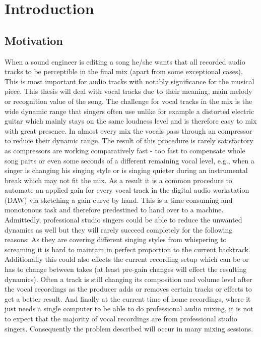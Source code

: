 \chapter{Introduction}
\label{chapter:introduction}

\section{Motivation}

When a sound engineer is editing a song he/she wants that all recorded audio tracks to be perceptible in the final mix (apart from some exceptional cases). This is most important for audio tracks with notably significance for the musical piece. This thesis will deal with vocal tracks due to their meaning, main melody or recognition value of the song. The challenge for vocal tracks in the mix is the wide dynamic range that singers often use unlike for example a distorted electric guitar which mainly stays on the same loudness level and is therefore easy to mix with great presence. In almost every mix the vocals pass through an compressor to reduce their dynamic range. The result of this procedure is rarely satisfactory as compressors are working comparatively fast - too fast to compensate whole song parts or even some seconds of a different remaining vocal level, e.g., when a singer is changing his singing style or is singing quieter during an instrumental break which may not fit the mix. As a result it is a common procedure to automate an applied gain for every vocal track in the digital audio workstation (DAW) via sketching a gain curve by hand. This is a time consuming and monotonous task and therefore predestined to hand over to a machine.\\
Admittedly, professional studio singers could be able to reduce the unwanted dynamics as well but they will rarely succeed completely for the following reasons: As they are covering different singing styles from whispering to screaming it is hard to maintain in perfect proportion to the current backtrack. Additionally this could also effects the current recording setup which can be or has to change between takes (at least pre-gain changes will effect the resulting dynamics). Often a track is still changing its composition and volume level after the vocal recordings as the producer adds or removes certain tracks or effects to get a better result. And finally at the current time of home recordings, where it just needs a single computer to be able to do professional audio mixing, it is not to expect that the majority of vocal recordings are from professional studio singers. Consequently the problem described will occur in many mixing sessions.\\

